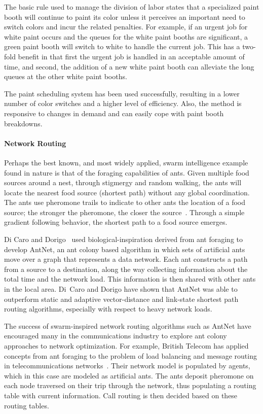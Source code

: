 The basic rule used to manage the division of labor states that a specialized paint booth will continue to paint its color unless it perceives an important need to switch colors and incur the related penalties.  For example, if an urgent job for white paint occurs and the queues for the white paint booths are significant, a green paint booth will switch to white to handle the current job.  This has a two-fold benefit in that first the urgent job is handled in an acceptable amount of time, and second, the addition of a new white paint booth can alleviate the long queues at the other white paint booths.

The paint scheduling system has been used successfully, resulting in a lower number of color switches and a higher level of efficiency.  Also, the method is responsive to changes in demand and can easily cope with paint booth breakdowns.

\paragraph{Network Routing\\}
Perhaps the best known, and most widely applied, swarm intelligence example found in nature is that of the foraging capabilities of ants.  Given multiple food sources around a nest, through stigmergy and random walking, the ants will locate the nearest food source (shortest path) without any global coordination.  The ants use pheromone trails to indicate to other ants the location of a food source; the stronger the pheromone, the closer the source~\cite{bonabeau:SwarmIntelligence}.  Through a simple gradient following behavior, the shortest path to a food source emerges.

Di Caro and Dorigo~\cite{caro-antnet} used biological-inspiration derived from ant foraging to develop AntNet, an ant colony based algorithm in which sets of artificial ants move over a graph that represents a data network.  Each ant constructs a path from a source to a destination, along the way collecting information about the total time and the network load.  This information is then shared with other ants in the local area.  Di~Caro and Dorigo have shown that AntNet was able to outperform static and adaptive vector-distance and link-state shortest path routing algorithms, especially with respect to heavy network loads.

The success of swarm-inspired network routing algorithms such as AntNet have encouraged many in the communications industry to explore ant colony approaches to network optimization.  For example, British Telecom has applied concepts from ant foraging to the problem of load balancing and message routing in telecommunications networks~\cite{appleby:agent-control}.  Their network model is populated by agents, which in this case are modeled as artificial ants.  The ants deposit pheromone on each node traversed on their trip through the network, thus populating a routing table with current information.  Call routing is then decided based on these routing tables.  

